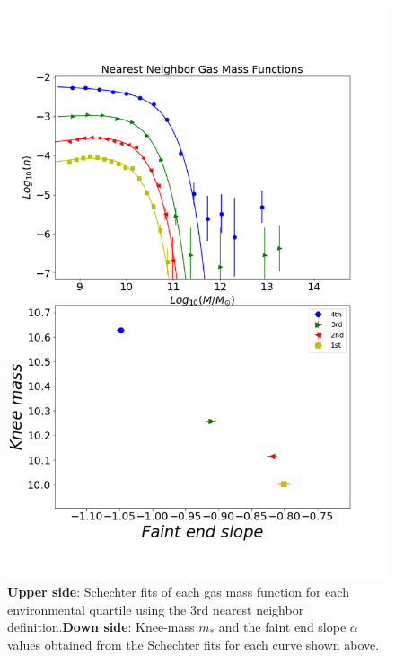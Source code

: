 \documentclass[a4paper,fleqn,usenatbib]{mnras}
\begin{document}
\begin{figure}
	\includegraphics[width=\columnwidth]{./pics/quartilesGas.png}
    \caption{\textbf{Upper side}: Schechter fits of each gas mass function for each environmental quartile using the 3rd nearest neighbor definition.\textbf{Down side}: Knee-mass $m_\ast$ and the faint end slope $\alpha$ values obtained from the Schechter fits for each curve shown above.}
    \label{fig:quartilesGas}
\end{figure}
\end{document}

